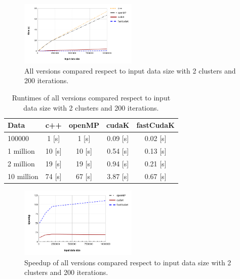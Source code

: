 \documentclass[10pt,twocolumn,letterpaper]{article}
\begin{document}
\begin{figure}[H]
\begin{center}
\includegraphics[width=0.5\textwidth]{latex/1.png}
\caption{All versions compared respect to input data size with 2 clusters and 200 iterations.}
\label{etichetta}
\end{center}
\end{figure}

\begin{table}[H]
\begin{center}
\begin{tabular}{|l|c|c|c|c|}
\hline
Data & c++ & openMP & cudaK & fastCudaK\\
\hline\hline
100000 & 1 [s] & 1 [s] & 0.09 [s] & 0.02 [s]\\
1 million & 10 [s] & 10 [s] & 0.54 [s] & 0.13 [s]\\
2 million & 19 [s] & 19 [s] & 0.94 [s] & 0.21 [s]\\
10 million & 74 [s] & 67 [s] & 3.87 [s] & 0.67 [s]\\
\hline
\end{tabular}
\end{center}
\caption{Runtimes of all versions compared respect to input data size with 2 clusters and 200 iterations.}
\end{table}

\begin{figure}[H]
\begin{center}
\includegraphics[width=0.5\textwidth]{latex/1s.png}
\caption{Speedup of all versions compared respect to input data size with 2 clusters and 200 iterations.}
\label{etichetta}
\end{center}
\end{figure}
\end{document}
